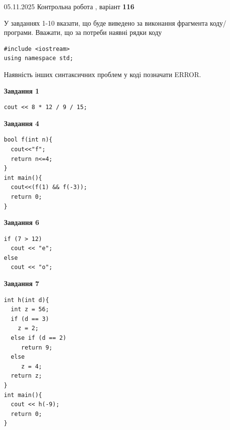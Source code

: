 \documentclass[12pt, ukrainian]{article}
\begin{document}
{\Large{05.11.2025 Контрольна робота , варіант  \No \textbf { 116 }\par}}
{
\begin {large}
У завданнях 1-10 вказати, що буде виведено за виконання фрагмента коду/про\-гра\-ми.
Вважати, що за потреби наявні рядки коду
\begin{verbatim}
#include <iostream>
using namespace std;
\end{verbatim}
Наявність інших синтаксичних проблем у коді позначати ERROR.

\begin{minipage}[t]{7.0cm}

\begin{center}
\textbf{Завдання 1}
\end{center}
\vspace{-8mm}

\begin{verbatim}
cout << 8 * 12 / 9 / 15;
\end{verbatim}



\begin{center}
\textbf{Завдання 4}
\end{center}
\vspace{-8mm}

\begin{verbatim}
bool f(int n){
  cout<<"f";
  return n<=4;
}
int main(){
  cout<<(f(1) && f(-3));
  return 0;
}
\end{verbatim}



\begin{center}
\textbf{Завдання 6}
\end{center}
\vspace{-8mm}

\begin{verbatim}
if (7 > 12)
  cout << "e";
else
  cout << "o";
\end{verbatim}



\begin{center}
\textbf{Завдання 7}
\end{center}
\vspace{-8mm}

\begin{verbatim}
int h(int d){
  int z = 56;
  if (d == 3)
    z = 2;
  else if (d == 2)
     return 9;
  else
     z = 4;
  return z;
}
int main(){
  cout << h(-9);
  return 0;
}
\end{verbatim}


\end{minipage}
\end{large}}
\end{document}
